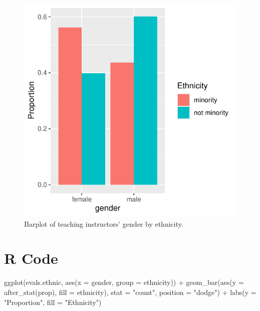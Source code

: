 \documentclass[
  letterpaper,
  DIV=11,
  numbers=noendperiod]{scrartcl}
\newenvironment{Shaded}{\begin{snugshade}}{\end{snugshade}}
\newcommand{\AttributeTok}[1]{\textcolor[rgb]{0.40,0.45,0.13}{#1}}
\newcommand{\FunctionTok}[1]{\textcolor[rgb]{0.28,0.35,0.67}{#1}}
\newcommand{\NormalTok}[1]{\textcolor[rgb]{0.00,0.23,0.31}{#1}}
\newcommand{\SpecialCharTok}[1]{\textcolor[rgb]{0.37,0.37,0.37}{#1}}
\newcommand{\StringTok}[1]{\textcolor[rgb]{0.13,0.47,0.30}{#1}}
\begin{document}
\begin{figure}[H]

{\centering \includegraphics{index_files/figure-pdf/unnamed-chunk-42-1.pdf}

}

\caption{Barplot of teaching instructors' gender by ethnicity.}

\end{figure}%

\section{R Code}

\begin{Shaded}
\begin{Highlighting}[]
\FunctionTok{ggplot}\NormalTok{(evals.ethnic, }\FunctionTok{aes}\NormalTok{(}\AttributeTok{x =}\NormalTok{ gender, }\AttributeTok{group =}\NormalTok{ ethnicity)) }\SpecialCharTok{+}
    \FunctionTok{geom\_bar}\NormalTok{(}\FunctionTok{aes}\NormalTok{(}\AttributeTok{y =} \FunctionTok{after\_stat}\NormalTok{(prop), }\AttributeTok{fill =}\NormalTok{ ethnicity), }
             \AttributeTok{stat =} \StringTok{"count"}\NormalTok{, }\AttributeTok{position =} \StringTok{"dodge"}\NormalTok{) }\SpecialCharTok{+}
    \FunctionTok{labs}\NormalTok{(}\AttributeTok{y =} \StringTok{"Proportion"}\NormalTok{, }\AttributeTok{fill =} \StringTok{"Ethnicity"}\NormalTok{)}
\end{Highlighting}
\end{Shaded}
\end{document}
